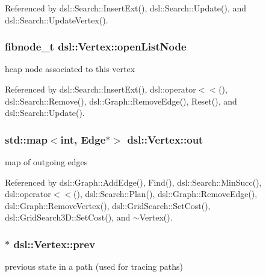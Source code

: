 \-Referenced by dsl\-::\-Search\-::\-Insert\-Ext(), dsl\-::\-Search\-::\-Update(), and dsl\-::\-Search\-::\-Update\-Vertex().

\subsubsection[{open\-List\-Node}]{\setlength{\rightskip}{0pt plus 5cm}fibnode\-\_\-t {\bf dsl\-::\-Vertex\-::open\-List\-Node}\hspace{0.3cm}{\ttfamily  [protected]}}\label{classdsl_1_1Vertex_a407f820d27408e3716ca42347d3a432f}


heap node associated to this vertex 



\-Referenced by dsl\-::\-Search\-::\-Insert\-Ext(), dsl\-::operator$<$$<$(), dsl\-::\-Search\-::\-Remove(), dsl\-::\-Graph\-::\-Remove\-Edge(), \-Reset(), and dsl\-::\-Search\-::\-Update().

\subsubsection[{out}]{\setlength{\rightskip}{0pt plus 5cm}std\-::map$<$int, {\bf \-Edge}$\ast$$>$ {\bf dsl\-::\-Vertex\-::out}}\label{classdsl_1_1Vertex_a8eece6b931c93f951100d2ab988c8666}


map of outgoing edges 



\-Referenced by dsl\-::\-Graph\-::\-Add\-Edge(), \-Find(), dsl\-::\-Search\-::\-Min\-Succ(), dsl\-::operator$<$$<$(), dsl\-::\-Search\-::\-Plan(), dsl\-::\-Graph\-::\-Remove\-Edge(), dsl\-::\-Graph\-::\-Remove\-Vertex(), dsl\-::\-Grid\-Search\-::\-Set\-Cost(), dsl\-::\-Grid\-Search3\-D\-::\-Set\-Cost(), and $\sim$\-Vertex().

\subsubsection[{prev}]{$\ast$ {\bf dsl\-::\-Vertex\-::prev}}\label{classdsl_1_1Vertex_a872a93b3aff52d54e65d2346f95f46e3}


previous state in a path (used for tracing paths) 



